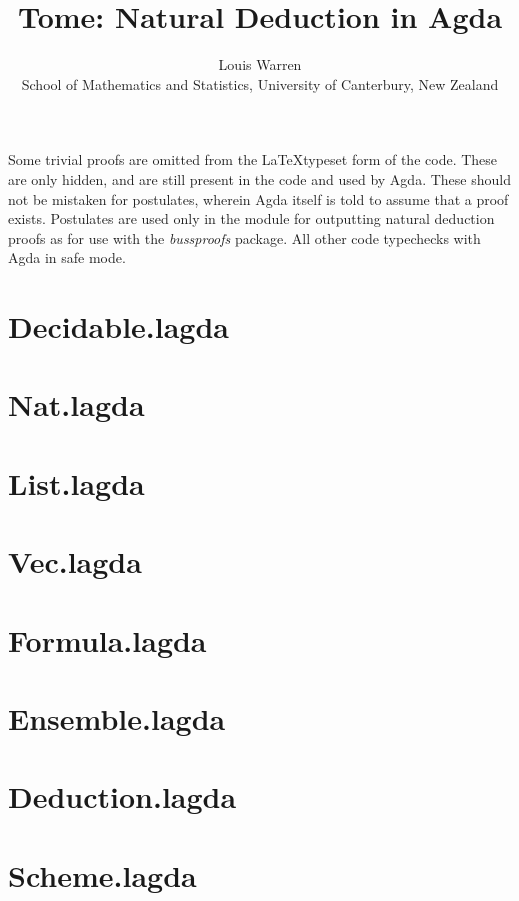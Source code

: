 \documentclass{article}
\begin{document}
\title{Tome: Natural Deduction in Agda}
\author{
Louis Warren \\
School of Mathematics and Statistics, University of Canterbury, New Zealand
}
\date{}
\maketitle

Some trivial proofs are omitted from the \LaTeX typeset form of the code. These
are only hidden, and are still present in the code and used by Agda. These
should not be mistaken for postulates, wherein Agda itself is told to assume
that a proof exists. Postulates are used only in the module for outputting
natural deduction proofs as \LaTex for use with the \emph{bussproofs} package.
All other code typechecks with Agda in safe mode.

\section{Decidable.lagda}


\section{Nat.lagda}


\section{List.lagda}


\section{Vec.lagda}


\section{Formula.lagda}


\section{Ensemble.lagda}


\section{Deduction.lagda}


\section{Scheme.lagda}


{}

\end{document}
